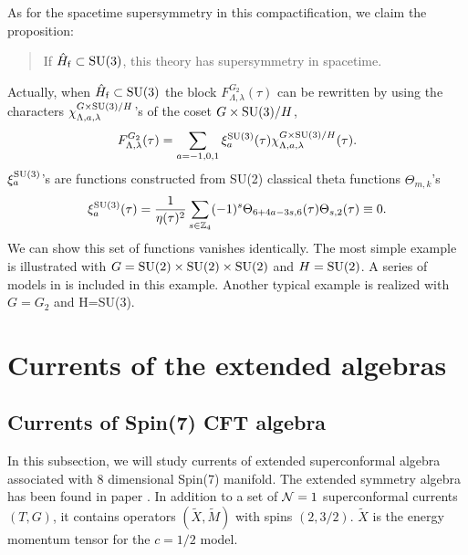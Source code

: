 \documentclass[a4paper,12pt]{article}
\numberwithin{equation}{section}
\newcommand{\Zb}{\mathbb{Z}}
\newcommand{\Ncal}{{\cal N}}
\newcommand{\Spin}[1]{{\rm Spin}(#1)}
\newcommand{\SU}[1]{{\rm SU}(#1)}
\newcommand{\Hf}{\hat{H}_{\rm f}}
\begin{document}
As for the spacetime supersymmetry in this compactification, we claim
the proposition:
\begin{quote}
 If $\Hf\subset \SU 3$, this theory has supersymmetry in spacetime.
\end{quote}
Actually, when $\Hf\subset \SU 3$ the block 
$F^{G_2}_{\Lambda,\lambda}(\tau)$
can be rewritten by using the characters  
$\chi^{G\times \SU3/H}_{\Lambda,a,\lambda}$'s of
the coset $G\times \SU3/H$,
\begin{align*}
 F^{G_2}_{\Lambda,\lambda}(\tau)=\sum_{a=-1,0,1}\xi^{\SU3}_{a}(\tau)
                  \chi^{G\times \SU3/H}_{\Lambda,a,\lambda}(\tau).
\end{align*}
$\xi^{\SU3}_{a}$'s are functions constructed from 
\SU2 classical theta functions  $\Theta_{m,k}$'s
\begin{align}
 \xi^{\SU3}_{a}(\tau)
   =\frac{1}{\eta(\tau)^2}\sum_{s\in\Zb_4}(-1)^{s}\Theta_{6+4a-3s,6}(\tau)
     \Theta_{s,2}(\tau) \equiv 0.\label{su(3)holonomyidentity}
\end{align}
We can show this set of functions vanishes identically.
The most simple example is illustrated with
$G=\SU2\times\SU2\times\SU2$ and $H=\SU2$. A series of models in
\cite{Eguchi:2001xa} is included in this example.
Another typical example is realized with $G=G_2$ and H=SU(3).

\section{Currents of the extended algebras}
\subsection{Currents of \Spin7 CFT algebra}
In this subsection, we will study currents of extended 
superconformal algebra associated with $8$ dimensional \Spin 7 manifold.
The extended symmetry algebra has been found in paper
\cite{Shatashvili:1994zw}.
In addition to a set of $\Ncal=1$ superconformal currents $(T,G)$, 
it contains operators $(\tilde{X},\tilde{M})$ with spins $(2,3/2)$.
$\tilde{X}$ is the energy momentum tensor 
for the $c=1/2$ model. 
\end{document}
